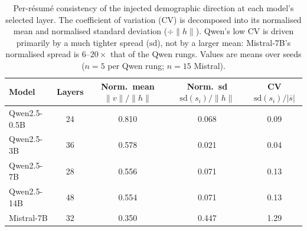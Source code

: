 \begin{table}[htbp]
  \centering
  \caption{Per-résumé consistency of the injected demographic direction at each
    model's selected layer. The coefficient of variation (CV) is decomposed into its
    normalised mean and normalised standard deviation ($\div\lVert h\rVert$). Qwen's
    low CV is driven primarily by a much tighter spread ($\mathrm{sd}$), not by a
    larger mean: Mistral-7B's normalised spread is $6$--$20\times$ that of the Qwen
    rungs. Values are means over seeds ($n{=}5$ per Qwen rung; $n{=}15$ Mistral).}
  \label{tab:cv_decomposition}
  \begin{tabular}{lcccc}
    \toprule
    Model & Layers & Norm.\ mean $\lVert v\rVert/\lVert h\rVert$
          & Norm.\ sd $\mathrm{sd}(s_i)/\lVert h\rVert$
          & CV $\mathrm{sd}(s_i)/|\overline{s}|$ \\
    \midrule
    Qwen2.5-0.5B & 24 & 0.810 & 0.068 & 0.09 \\
    Qwen2.5-3B   & 36 & 0.578 & 0.021 & 0.04 \\
    Qwen2.5-7B   & 28 & 0.556 & 0.071 & 0.13 \\
    Qwen2.5-14B  & 48 & 0.554 & 0.071 & 0.13 \\
    \midrule
    Mistral-7B   & 32 & 0.350 & 0.447 & 1.29 \\
    \bottomrule
  \end{tabular}
\end{table}

